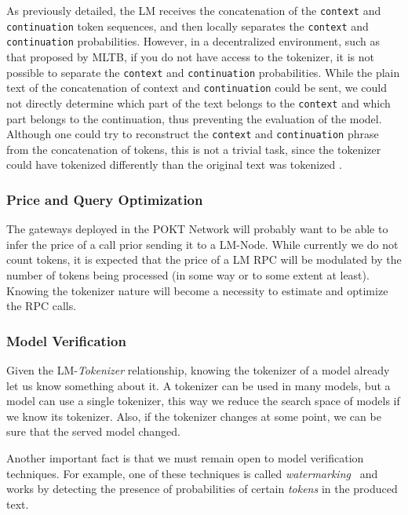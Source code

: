 As previously detailed, the \gls{LM} receives the concatenation of the \texttt{context} and \texttt{continuation} token sequences, and then locally separates the \texttt{context} and \texttt{continuation} probabilities. 
However, in a decentralized environment, such as that proposed by \gls{MLTB}, if you do not have access to the tokenizer, it is not possible to separate the \texttt{context} and \texttt{continuation} probabilities. 
While the plain text of the concatenation of context and \texttt{continuation} could be sent, we could not directly determine which part of the text belongs to the \texttt{context} and which part belongs to the continuation, thus preventing the evaluation of the model. 
Although one could try to reconstruct the \texttt{context} and \texttt{continuation} phrase from the concatenation of tokens, this is not a trivial task, since the tokenizer could have tokenized differently than the original text was tokenized \cite{biderman_lessons_2024}. 

\subsubsection*{Price and Query Optimization}

The gateways deployed in the POKT Network will probably want to be able to infer the price of a call prior sending it to a \gls{LM}-Node. While currently we do not count tokens, it is expected that the price of a \gls{LM} \gls{RPC} will be modulated by the number of tokens being processed (in some way or to some extent at least). Knowing the tokenizer nature will become a necessity to estimate and optimize the \gls{RPC} calls.

\subsubsection*{Model Verification}

Given the \gls{LM}-\emph{Tokenizer} relationship, knowing the tokenizer of a model already let us know something about it. A tokenizer can be used in many models, but a model can use a single tokenizer, this way we reduce the search space of models if we know its tokenizer. Also, if the tokenizer changes at some point, we can be sure that the served model changed.

Another important fact is that we must remain open to model verification techniques. For example, one of these techniques is called \emph{watermarking}~\cite{kirchenbauer2023watermark} and works by detecting the presence of probabilities of certain \emph{tokens} in the produced text.


